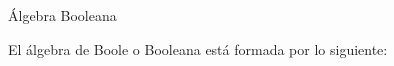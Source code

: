 \documentclass[10pt,xcolor={dvipsnames}]{beamer}
\begin{document}
\begin{frame}{Álgebra Booleana}
\begin{center}
El álgebra de Boole o Booleana está formada por lo siguiente: \\ \pause
{}
\end{center}
\end{frame}
\end{document}
